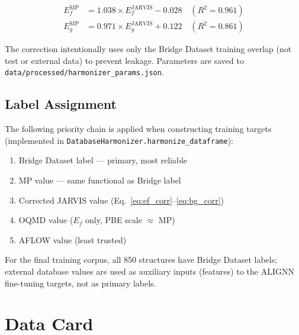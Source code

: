 \documentclass[10pt, a4paper]{article}
\begin{document}
\begin{align}
E_f^{\text{MP}} &= 1.038 \times E_f^{\text{JARVIS}} - 0.028
    \quad (R^2 = 0.961) \label{eq:ef_corr} \\
E_g^{\text{MP}} &= 0.971 \times E_g^{\text{JARVIS}} + 0.122
    \quad (R^2 = 0.861) \label{eq:bg_corr}
\end{align}

The correction intentionally uses only the Bridge Dataset training
overlap (not test or external data) to prevent leakage.
Parameters are saved to \texttt{data/processed/harmonizer\_params.json}.

\subsection{Label Assignment}

The following priority chain is applied when constructing training
targets (implemented in \texttt{DatabaseHarmonizer.harmonize\_dataframe}):

\begin{enumerate}
  \item Bridge Dataset label — primary, most reliable
  \item MP value — same functional as Bridge label
  \item Corrected JARVIS value (Eq.~\ref{eq:ef_corr}--\ref{eq:bg_corr})
  \item OQMD value ($E_f$ only, PBE scale $\approx$ MP)
  \item AFLOW value (least trusted)
\end{enumerate}

For the final training corpus, all 850 structures have Bridge Dataset
labels; external database values are used as auxiliary inputs
(features) to the ALIGNN fine-tuning targets, not as primary labels.

\section{Data Card}
\end{document}
